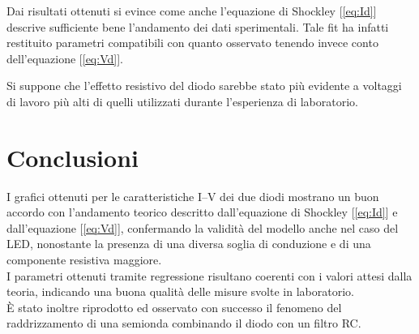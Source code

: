 \documentclass[9pt,a4paper,twocolumn,twoside]{tau-class/tau}
\begin{document}
Dai risultati ottenuti si evince come anche l'equazione di Shockley [\ref{eq:Id}] descrive sufficiente bene l'andamento dei dati sperimentali. Tale fit ha infatti restituito parametri compatibili con quanto osservato tenendo invece conto dell'equazione [\ref{eq:Vd}]. 

Si suppone che l'effetto resistivo del diodo sarebbe stato più evidente a voltaggi di lavoro più alti di quelli utilizzati durante l'esperienza di laboratorio. 

 
\section{Conclusioni}
I grafici ottenuti per le caratteristiche I–V dei due diodi mostrano un buon accordo con l'andamento teorico descritto dall'equazione di Shockley [\ref{eq:Id}] e dall'equazione [\ref{eq:Vd}], confermando la validità del modello anche nel caso del LED, nonostante la presenza di una diversa soglia di conduzione e di una componente resistiva maggiore.\\
I parametri ottenuti tramite regressione risultano coerenti con i valori attesi dalla teoria, indicando una buona qualità delle misure svolte in laboratorio.\\
È stato inoltre riprodotto ed osservato con successo il fenomeno del raddrizzamento di una semionda combinando il diodo con un filtro RC. 
\end{document}
